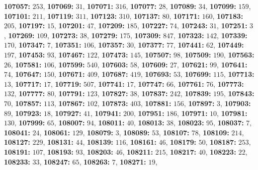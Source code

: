 \textsf{\bfseries 107057:} $253$, \textsf{\bfseries 107069:} $31$, \textsf{\bfseries 107071:} $316$, \textsf{\bfseries 107077:} $28$, \textsf{\bfseries 107089:} $34$, \textsf{\bfseries 107099:} $159$, \textsf{\bfseries 107101:} $211$, \textsf{\bfseries 107119:} $311$, \textsf{\bfseries 107123:} $310$, \textsf{\bfseries 107137:} $80$, \textsf{\bfseries 107171:} $160$, \textsf{\bfseries 107183:} $205$, \textsf{\bfseries 107197:} $15$, \textsf{\bfseries 107201:} $47$, \textsf{\bfseries 107209:} $185$, \textsf{\bfseries 107227:} $74$, \textsf{\bfseries 107243:} $31$, \textsf{\bfseries 107251:} $3$, \textsf{\bfseries 107269:} $109$, \textsf{\bfseries 107273:} $38$, \textsf{\bfseries 107279:} $175$, \textsf{\bfseries 107309:} $847$, \textsf{\bfseries 107323:} $142$, \textsf{\bfseries 107339:} $170$, \textsf{\bfseries 107347:} $7$, \textsf{\bfseries 107351:} $106$, \textsf{\bfseries 107357:} $30$, \textsf{\bfseries 107377:} $77$, \textsf{\bfseries 107441:} $62$, \textsf{\bfseries 107449:} $197$, \textsf{\bfseries 107453:} $93$, \textsf{\bfseries 107467:} $122$, \textsf{\bfseries 107473:} $145$, \textsf{\bfseries 107507:} $98$, \textsf{\bfseries 107509:} $190$, \textsf{\bfseries 107563:} $26$, \textsf{\bfseries 107581:} $106$, \textsf{\bfseries 107599:} $540$, \textsf{\bfseries 107603:} $58$, \textsf{\bfseries 107609:} $27$, \textsf{\bfseries 107621:} $99$, \textsf{\bfseries 107641:} $74$, \textsf{\bfseries 107647:} $150$, \textsf{\bfseries 107671:} $409$, \textsf{\bfseries 107687:} $419$, \textsf{\bfseries 107693:} $53$, \textsf{\bfseries 107699:} $115$, \textsf{\bfseries 107713:} $13$, \textsf{\bfseries 107717:} $17$, \textsf{\bfseries 107719:} $507$, \textsf{\bfseries 107741:} $17$, \textsf{\bfseries 107747:} $66$, \textsf{\bfseries 107761:} $76$, \textsf{\bfseries 107773:} $132$, \textsf{\bfseries 107777:} $80$, \textsf{\bfseries 107791:} $123$, \textsf{\bfseries 107827:} $38$, \textsf{\bfseries 107837:} $242$, \textsf{\bfseries 107839:} $195$, \textsf{\bfseries 107843:} $70$, \textsf{\bfseries 107857:} $113$, \textsf{\bfseries 107867:} $102$, \textsf{\bfseries 107873:} $403$, \textsf{\bfseries 107881:} $156$, \textsf{\bfseries 107897:} $3$, \textsf{\bfseries 107903:} $89$, \textsf{\bfseries 107923:} $18$, \textsf{\bfseries 107927:} $41$, \textsf{\bfseries 107941:} $200$, \textsf{\bfseries 107951:} $186$, \textsf{\bfseries 107971:} $10$, \textsf{\bfseries 107981:} $130$, \textsf{\bfseries 107999:} $65$, \textsf{\bfseries 108007:} $94$, \textsf{\bfseries 108011:} $40$, \textsf{\bfseries 108013:} $38$, \textsf{\bfseries 108023:} $95$, \textsf{\bfseries 108037:} $7$, \textsf{\bfseries 108041:} $24$, \textsf{\bfseries 108061:} $129$, \textsf{\bfseries 108079:} $3$, \textsf{\bfseries 108089:} $53$, \textsf{\bfseries 108107:} $78$, \textsf{\bfseries 108109:} $214$, \textsf{\bfseries 108127:} $229$, \textsf{\bfseries 108131:} $44$, \textsf{\bfseries 108139:} $116$, \textsf{\bfseries 108161:} $46$, \textsf{\bfseries 108179:} $50$, \textsf{\bfseries 108187:} $253$, \textsf{\bfseries 108191:} $107$, \textsf{\bfseries 108193:} $93$, \textsf{\bfseries 108203:} $46$, \textsf{\bfseries 108211:} $215$, \textsf{\bfseries 108217:} $40$, \textsf{\bfseries 108223:} $22$, \textsf{\bfseries 108233:} $33$, \textsf{\bfseries 108247:} $65$, \textsf{\bfseries 108263:} $7$, \textsf{\bfseries 108271:} $19$, 
